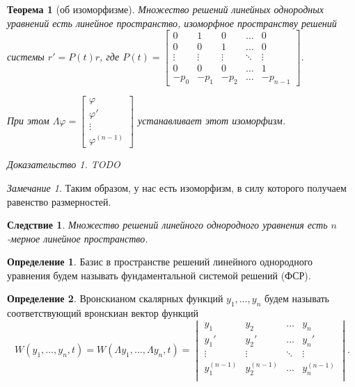 \documentclass[a5paper, 10pt]{article}
\theoremstyle{definition}
\newtheorem{Def}{Определение}
\theoremstyle{plain}
\newtheorem{Th}{Теорема}
\newtheorem{Cor}{Следствие}
\theoremstyle{remark}
\newtheorem*{Note}{Замечание}
\newtheorem*{Proof}{Доказательство}
\begin{document}
	\begin{Th}[об изоморфизме]
		Множество решений линейных однородных уравнений есть линейное пространство, изоморфное пространству решений системы $r'=P(t)r$, где $P(t) = \begin{bmatrix}
			0 & 1 & 0 & \dots & 0\\
			0 & 0 & 1 & \dots & 0\\
			\vdots & \vdots & \vdots &\ddots & \vdots\\
			0 & 0 & 0 & \dots & 1\\
			-p_0 & -p_1 & -p_2 & \dots & -p_{n-1}
		\end{bmatrix}
		$. 
		
		При этом $\Lambda \varphi = \begin{bmatrix}
			\varphi\\\varphi'\\\vdots\\\varphi^{(n-1)}
		\end{bmatrix}
		$ устанавливает этот изоморфизм.
		\begin{Proof}
			TODO
		\end{Proof}
	\end{Th}
	
	\begin{Note}
		Таким образом, у нас есть изоморфизм, в силу которого получаем равенство размерностей.
	\end{Note}
	
	\begin{Cor}
		Множество решений линейного однородного уравнения есть $n$-мерное линейное пространство.
	\end{Cor}

	\begin{Def}
		Базис в пространстве решений линейного однородного уравнения будем называть фундаментальной системой решений (ФСР).
	\end{Def}

	\begin{Def}
		Вронскианом скалярных функций $y_1, \dots, y_n$ будем называть соответствующий вронскиан вектор функций 
		\[
		W(y_1, \dots, y_n, t) = W(\Lambda y_1, \dots, \Lambda y_n, t) = \begin{vmatrix}
			y_1 & y_2 & \dots & y_n \\
			y_1' & y_2' & \dots & y_n' \\
			\vdots & \vdots & \ddots & \vdots \\
			y_1^{(n-1)} & y_2^{(n-1)} & \dots & y_n^{(n-1)} \\
		\end{vmatrix}.
		\]
	\end{Def}
	
\end{document}
